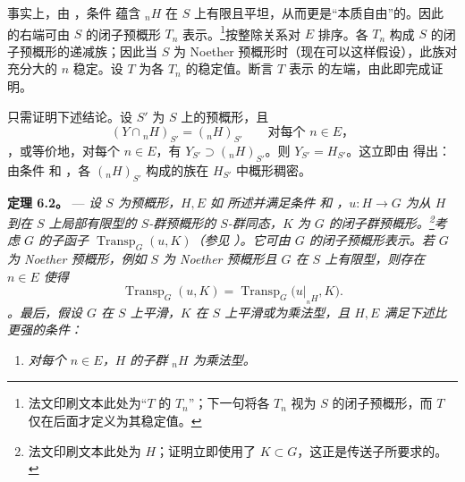 事实上，由 ，条件  蕴含 \({}_nH\) 在 \(S\) 上有限且平坦，从而更是“本质自由”的。因此  的右端可由 \(S\) 的闭子预概形 \(T_n\) 表示。\footnote{法文印刷文本此处为“\(T\) 的 \(T_n\)”；下一句将各 \(T_n\) 视为 \(S\) 的闭子预概形，而 \(T\) 仅在后面才定义为其稳定值。}按整除关系对 \(E\) 排序。各 \(T_n\) 构成 \(S\) 的闭子预概形的递减族；因此当 \(S\) 为 Noether 预概形时（现在可以这样假设），此族对充分大的 \(n\) 稳定。设 \(T\) 为各 \(T_n\) 的稳定值。断言 \(T\) 表示  的左端，由此即完成证明。

只需证明下述结论。设 \(S'\) 为 \(S\) 上的预概形，且  \[
  (Y\cap{}_nH)_{S'}=({}_nH)_{S'}
  \qquad\text{对每个 \(n\in E\)，}
\]，或等价地，对每个 \(n\in E\)，有 \(Y_{S'}\supset({}_nH)_{S'}\)。则 \(Y_{S'}=H_{S'}\)。这立即由  得出：由条件  和 ，各 \(({}_nH)_{S'}\) 构成的族在 \(H_{S'}\) 中概形稠密。

\medskip\noindent{}\textbf{定理 6.2。} --- \textit{设 \(S\) 为预概形，\(H,E\) 如  所述并满足条件  和 ，\(u:H\to G\) 为从 \(H\) 到在 \(S\) 上局部有限型的 \(S\)-群预概形的 \(S\)-群同态，\(K\) 为 \(G\) 的闭子群预概形。\footnote{法文印刷文本此处为 \(H\)；证明立即使用了 \(K\subset G\)，这正是传送子所要求的。}考虑 \(G\) 的子函子 \(\operatorname{Transp}_G(u,K)\)（参见 ）。它可由 \(G\) 的闭子预概形表示。若 \(G\) 为 Noether 预概形，例如 \(S\) 为 Noether 预概形且 \(G\) 在 \(S\) 上有限型，则存在 \(n\in E\) 使得}  \[
  \operatorname{Transp}_G(u,K)
  =
  \operatorname{Transp}_G\bigl(u|_{{}_nH},K\bigr).
\]\textit{。最后，假设 \(G\) 在 \(S\) 上平滑，\(K\) 在 \(S\) 上平滑或为乘法型，且 \(H,E\) 满足下述比  更强的条件：}

\begin{enumerate}\item[\(a'\)]\textit{对每个 \(n\in E\)，\(H\) 的子群 \({}_nH\) 为乘法型。}\end{enumerate}

